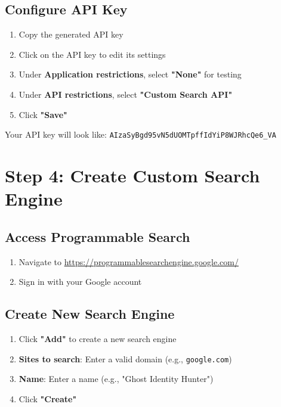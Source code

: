 \documentclass[11pt,a4paper]{article}
\begin{document}
\subsection{Configure API Key}

\begin{enumerate}
    \item Copy the generated API key
    \item Click on the API key to edit its settings
    \item Under \textbf{Application restrictions}, select \textbf{"None"} for testing
    \item Under \textbf{API restrictions}, select \textbf{"Custom Search API"}
    \item Click \textbf{"Save"}
\end{enumerate}

\begin{tcolorbox}[colback=codebg,colframe=gray,title=API Key Format]
Your API key will look like: \texttt{AIzaSyBgd95vN5dUOMTpffIdYiP8WJRhcQe6\_VA}
\end{tcolorbox}

\section{Step 4: Create Custom Search Engine}

\subsection{Access Programmable Search}

\begin{enumerate}
    \item Navigate to \url{https://programmablesearchengine.google.com/}
    \item Sign in with your Google account
\end{enumerate}

\subsection{Create New Search Engine}

\begin{enumerate}
    \item Click \textbf{"Add"} to create a new search engine
    \item \textbf{Sites to search}: Enter a valid domain (e.g., \texttt{google.com})
    \item \textbf{Name}: Enter a name (e.g., "Ghost Identity Hunter")
    \item Click \textbf{"Create"}
\end{enumerate}
\end{document}
